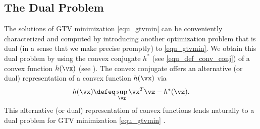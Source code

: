 \documentclass[lettersize,journal]{IEEEtran}
\begin{document}
\subsection{The Dual Problem} 
\label{sec_dual_problem_GTV_Min}

The solutions of GTV minimization \eqref{equ_gtvmin} can be conveniently characterized and computed 
by introducing another optimization problem that is dual (in a sense that we make precise promptly) 
to \eqref{equ_gtvmin}. We obtain this dual problem by using the convex conjugate $h^{*}$ (see \eqref{equ_def_conv_conj}) of 
a convex function $h(\vx)$ (see \cite{BoydConvexBook}). The convex conjugate offers an alternative (or dual) 
representation of a convex function $h(\vx)$ via 
\begin{equation}
\label{equ_def_cvx_conj}
h(\vx) \defeq \sup\limits_{\vz} \vx^{T} \vz - h^{*}(\vz).
\vspace{-3mm}
\end{equation}
This alternative (or dual) representation of convex functions lends naturally to a 
dual problem for GTV minimization \eqref{equ_gtvmin} . 
\end{document}
